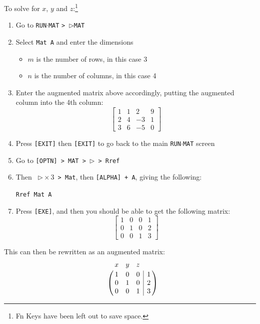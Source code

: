 \documentclass[a5paper,draft]{memoir}
\def\VR{\kern-\arraycolsep\strut\vrule &\kern-\arraycolsep}
\def\vr{\kern-\arraycolsep & \kern-\arraycolsep}
\def\code#1{\texttt{#1}}
\def\runmat{\code{RUN$\cdot$MAT} }
\begin{document}
To solve for $x$, $y$ and $z$:\footnote{ Fn Keys have been left out to save space.}
\begin{enumerate}
	\item Go to \runmat \code{> $\triangleright$MAT}
	\item Select \code{Mat A} and enter the dimensions
	\begin{itemize}
		\item $m$ is the number of rows, in this case 3
		\item $n$ is the number of columns, in this case 4
	\end{itemize}
	\item Enter the augmented matrix above accordingly, putting the augmented column into the 4th column:
	\begin{equation*}
		\left[
			\begin{array}{cccc}
			1 & 1 & 2  & 9 \\  
			2 & 4 & -3 & 1 \\
			3 & 6 & -5 & 0
			\end{array}
		\right]
	\end{equation*}
	\item Press \code{[EXIT]} then \code{[EXIT]} to go back to the main \runmat screen
	\item Go to \code{[OPTN] > MAT > $\triangleright$ > Rref}
	\item Then \code{ $\triangleright \times 3$ > Mat}, then \code{[ALPHA] + A}, giving the following:
	\begin{center}
		\code{Rref Mat A}
	\end{center}
	\item Press \code{[EXE]}, and then you should be able to get the following matrix:
	\begin{equation*}
		\left[
			\begin{array}{cccc}
			1 & 0 & 0 & 1 \\  
			0 & 1 & 0 & 2 \\
			0 & 0 & 1 & 3
			\end{array}
		\right]
	\end{equation*}
\end{enumerate}

This can then be rewritten as an augmented matrix:
\begin{equation*}
\bordermatrix{  & x & y & z & \vr ~ \cr
			  ~ & 1 & 0 & 0 & \VR 1 \cr
			  ~ & 0 & 1 & 0 & \VR 2 \cr
			  ~ & 0 & 0 & 1 & \VR 3 }
\end{equation*}
\end{document}

